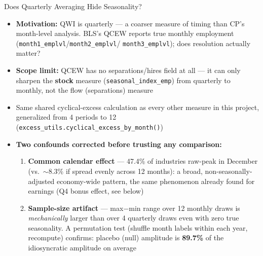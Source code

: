 \documentclass[aspectratio=169]{beamer}
\begin{document}
\begin{frame}{Does Quarterly Averaging Hide Seasonality?}
  \small
  \begin{itemize}
    \item \textbf{Motivation:} QWI is quarterly --- a coarser measure of
          timing than CP's month-level analysis. BLS's QCEW reports true
          monthly employment (\texttt{month1\_emplvl}/\texttt{month2\_emplvl}/
          \texttt{month3\_emplvl}); does resolution actually matter?
    \item \textbf{Scope limit:} QCEW has no separations/hires field at all
          --- it can only sharpen the \textbf{stock} measure
          (\texttt{seasonal\_index\_emp}) from quarterly to monthly, not the
          flow (separations) measure
    \item Same shared cyclical-excess calculation as every other measure in
          this project, generalized from 4 periods to 12
          (\texttt{excess\_utils.cyclical\_excess\_by\_month()})
    \item \textbf{Two confounds corrected before trusting any comparison:}
    \begin{enumerate}
      \item \textbf{Common calendar effect} --- 47.4\% of industries
            raw-peak in December (vs.\ $\sim$8.3\% if spread evenly across
            12 months): a broad, non-seasonally-adjusted economy-wide
            pattern, the same phenomenon already found for earnings (Q4
            bonus effect, see below)
      \item \textbf{Sample-size artifact} --- max$-$min range over 12
            monthly draws is \emph{mechanically} larger than over 4
            quarterly draws even with zero true seasonality. A permutation
            test (shuffle month labels within each year, recompute)
            confirms: placebo (null) amplitude is \textbf{89.7\%} of the
            idiosyncratic amplitude on average
    \end{enumerate}
  \end{itemize}
\end{frame}
\end{document}
